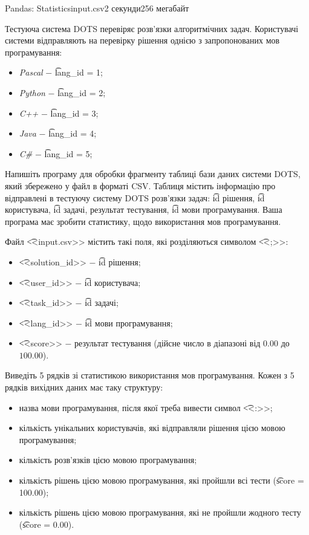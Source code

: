 \begin{problem}{Pandas: Statistics}{input.csv}{}{2 секунди}{256 мегабайт}

Тестуюча система DOTS перевіряє розв'язки алгоритмічних задач.
Користувачі системи відправляють на перевірку рішення однією з запропонованих мов програмування:
\begin{itemize}
 \setlength\itemsep{0em}
 \item \textit{Pascal} $-$ \t{lang\_id = 1};
 \item \textit{Python} $-$ \t{lang\_id = 2};
 \item \textit{C++} $-$ \t{lang\_id = 3};
 \item \textit{Java} $-$ \t{lang\_id = 4};
 \item \textit{C\#} $-$ \t{lang\_id = 5};
\end{itemize}

Напишіть програму для обробки фрагменту таблиці бази даних системи DOTS, який збережено у файл в форматі CSV.
Таблиця містить інформацію про відправлені в тестуючу систему DOTS розв'язки задач: 
\t{id} рішення, \t{id} користувача, \t{id} задачі, результат тестування, \t{id} мови програмування.
Ваша програма має зробити статистику, щодо використання мов програмування. 

\InputFile
Файл \t{<<input.csv>>} містить такі поля, які розділяються символом \t{<<;>>}:
\begin{itemize}
  \setlength\itemsep{0em}
  \item \t{<<solution\_id>>} $-$ \t{id} рішення;
  \item \t{<<user\_id>>} $-$ \t{id} користувача;
  \item \t{<<task\_id>>} $-$ \t{id} задачі;
  \item \t{<<lang\_id>>} $-$ \t{id} мови програмування;
  \item \t{<<score>>} $-$ результат тестування (дійсне число в діапазоні від $0.00$ до $100.00$). 
\end{itemize}

\OutputFile
Виведіть 5 рядків зі статистикою використання мов програмування.
Кожен з 5 рядків вихідних даних має таку структуру: 
\begin{itemize}
  \setlength\itemsep{0em}
  \item назва мови програмування, після якої треба вивести символ \t{<<:>>};
  \item кількість унікальних користувачів, які відправляли рішення цією мовою програмування;
  \item кількість розв'язків цією мовою програмування;
  \item кількість рішень цією мовою програмування, які пройшли всі тести (\t{score = 100.00});
  \item кількість рішень цією мовою програмування, які не пройшли жодного тесту (\t{score = 0.00}).
\end{itemize}

\Example
\begin{example}
%
\end{example}

\end{problem}

